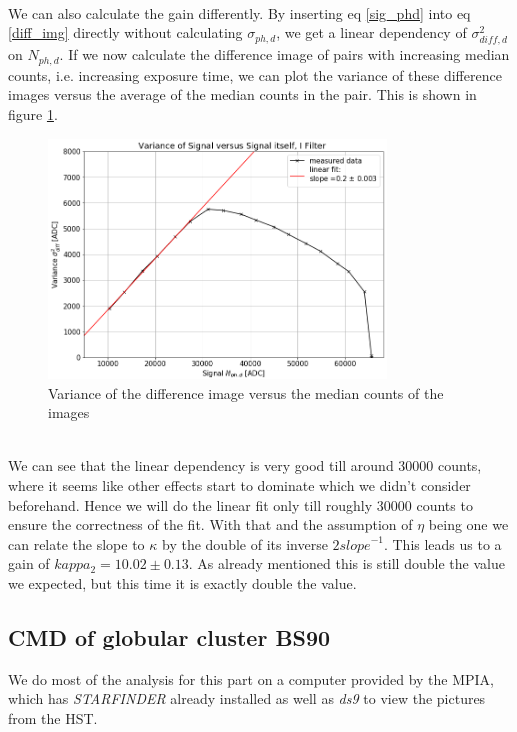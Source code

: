\vspace{3mm}\\
We can also calculate the gain differently. By inserting eq \ref{sig_phd} into eq \ref{diff_img} directly without calculating $\sigma_{ph,d}$, we get a linear dependency of $\sigma_{diff,d}^2$ on $N_{ph,d}$. If we now calculate the difference image of pairs with increasing median counts, i.e. increasing exposure time, we can plot the variance of these difference images versus the average of the median counts in the pair. This is shown in figure \ref{noise_diff}. 
\begin{figure}[h]
	\centering
	\includegraphics[width=0.8\textwidth]{report_pictures/Noise.png}
	\caption{Variance of the difference image versus the median counts of the images}
	\label{noise_diff}
\end{figure}
\vspace{2mm}\\
We can see that the linear dependency is very good till around 30000 counts, where it seems like other effects start to dominate which we didn't consider beforehand. Hence we will do the linear fit only till roughly 30000 counts to ensure the correctness of the fit. With that and the assumption of $\eta$ being one we can relate the slope to $\kappa$ by the double of its inverse $2\textit{slope}^{-1}$. This leads us to a gain of $kappa_2 = 10.02 \pm 0.13$. As already mentioned this is still double the value we expected, but this time it is exactly double the value.\\
\newpage
\subsection{CMD of globular cluster BS90}
We do most of the analysis for this part on a computer provided by the MPIA, which has \textit{STARFINDER} already installed as well as \textit{ds9} to view the pictures from the HST.
